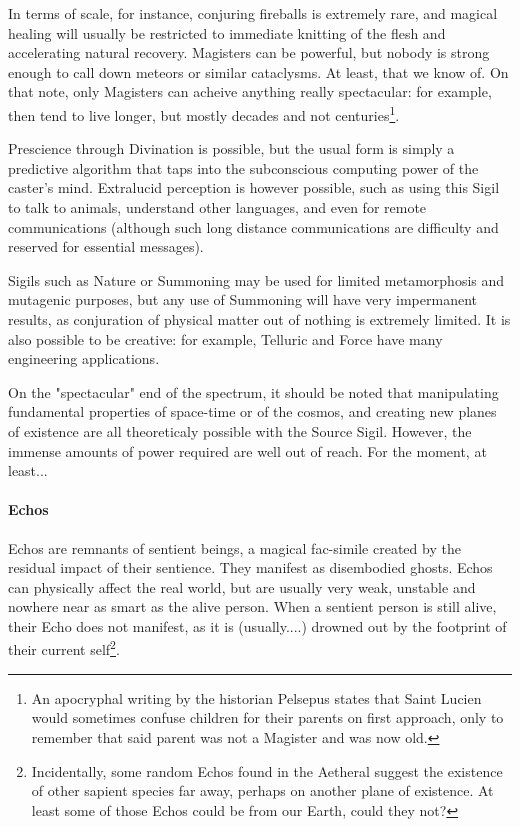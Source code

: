 In terms of scale, for instance, conjuring fireballs is extremely rare, and magical healing will usually be restricted to immediate knitting of the flesh and accelerating natural recovery. Magisters can be powerful, but nobody is strong enough to call down meteors or similar cataclysms. At least, that we know of. On that note, only Magisters can acheive anything really spectacular: for example, then tend to live longer, but mostly decades and not centuries\footnote{An apocryphal writing by the historian Pelsepus states that Saint Lucien would sometimes confuse children for their parents on first approach, only to remember that said parent was not a Magister and was now old.}.

Prescience through Divination is possible, but the usual form is simply a predictive algorithm that taps into the subconscious computing power of the caster's mind. Extralucid perception is however possible, such as using this Sigil to talk to animals, understand other languages, and even for remote communications (although such long distance communications are difficulty and reserved for essential messages).

Sigils such as Nature or Summoning may be used for limited metamorphosis and mutagenic purposes, but any use of Summoning will have very impermanent results, as conjuration of physical matter out of nothing is extremely limited. It is also possible to be creative: for example, Telluric and Force have many engineering applications.

On the "spectacular" end of the spectrum, it should be noted that manipulating fundamental properties of space-time or of the cosmos, and creating new planes of existence are all theoreticaly possible with the Source Sigil. However, the immense amounts of power required are well out of reach. For the moment, at least...

\paragraph{Echos}

Echos are remnants of sentient beings, a magical fac-simile created by the residual impact of their sentience. They manifest as disembodied ghosts. Echos can physically affect the real world, but are usually very weak, unstable and nowhere near as smart as the alive person. When a sentient person is still alive, their Echo does not manifest, as it is (usually....) drowned out by the footprint of their current self\footnote{Incidentally, some random Echos found in the Aetheral suggest the existence of other sapient species far away, perhaps on another plane of existence. At least some of those Echos could be from our Earth, could they not?}.

